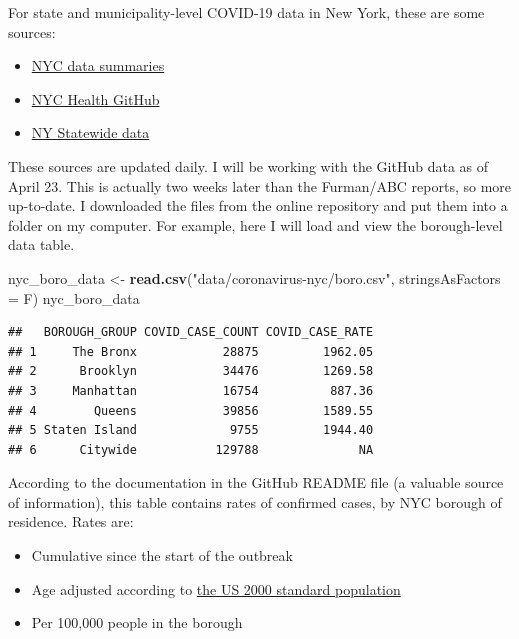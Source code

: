 \documentclass[openany]{book}
\newenvironment{Shaded}{\begin{snugshade}}{\end{snugshade}}
\newcommand{\DataTypeTok}[1]{\textcolor[rgb]{0.13,0.29,0.53}{#1}}
\newcommand{\KeywordTok}[1]{\textcolor[rgb]{0.13,0.29,0.53}{\textbf{#1}}}
\newcommand{\NormalTok}[1]{#1}
\newcommand{\StringTok}[1]{\textcolor[rgb]{0.31,0.60,0.02}{#1}}
\providecommand{\tightlist}{%
  \setlength{\itemsep}{0pt}\setlength{\parskip}{0pt}}
\begin{document}
For state and municipality-level COVID-19 data in New York, these are some sources:

\begin{itemize}
\tightlist
\item
  \href{https://www1.nyc.gov/site/doh/covid/covid-19-data-archive.page}{NYC data summaries}
\item
  \href{https://github.com/nychealth/coronavirus-data}{NYC Health GitHub}
\item
  \href{https://health.data.ny.gov/Health/New-York-State-Statewide-COVID-19-Testing/xdss-u53e}{NY Statewide data}
\end{itemize}

These sources are updated daily. I will be working with the GitHub data as of April 23. This is actually two weeks later than the Furman/ABC reports, so more up-to-date. I downloaded the files from the online repository and put them into a folder on my computer. For example, here I will load and view the borough-level data table.

\begin{Shaded}
\begin{Highlighting}[]
\NormalTok{nyc_boro_data <-}\StringTok{ }\KeywordTok{read.csv}\NormalTok{(}\StringTok{"data/coronavirus-nyc/boro.csv"}\NormalTok{, }\DataTypeTok{stringsAsFactors =}\NormalTok{ F)}
\NormalTok{nyc_boro_data}
\end{Highlighting}
\end{Shaded}

\begin{verbatim}
##   BOROUGH_GROUP COVID_CASE_COUNT COVID_CASE_RATE
## 1     The Bronx            28875         1962.05
## 2      Brooklyn            34476         1269.58
## 3     Manhattan            16754          887.36
## 4        Queens            39856         1589.55
## 5 Staten Island             9755         1944.40
## 6      Citywide           129788              NA
\end{verbatim}

According to the documentation in the GitHub README file (a valuable source of information), this table contains rates of confirmed cases, by NYC borough of residence. Rates are:

\begin{itemize}
\tightlist
\item
  Cumulative since the start of the outbreak
\item
  Age adjusted according to \href{https://www.cdc.gov/nchs/data/statnt/statnt20.pdf}{the US 2000 standard population}
\item
  Per 100,000 people in the borough
\end{itemize}
\end{document}
